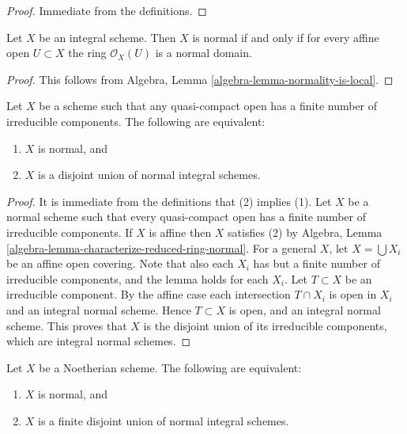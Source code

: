 \begin{proof}
Immediate from the definitions.
\end{proof}

\begin{lemma}
\label{lemma-integral-normal}
Let $X$ be an integral scheme.
Then $X$ is normal if and only if for every affine open
$U \subset X$ the ring $\mathcal{O}_X(U)$ is a normal domain.
\end{lemma}

\begin{proof}
This follows from
Algebra, Lemma \ref{algebra-lemma-normality-is-local}.
\end{proof}

\begin{lemma}
\label{lemma-normal-locally-finite-nr-irreducibles}
Let $X$ be a scheme such that any quasi-compact open has a finite number
of irreducible components. The following are equivalent:
\begin{enumerate}
\item $X$ is normal, and
\item $X$ is a disjoint union of normal integral schemes.
\end{enumerate}
\end{lemma}

\begin{proof}
It is immediate from the definitions that (2) implies (1).
Let $X$ be a normal scheme such that every quasi-compact open
has a finite number of irreducible components.
If $X$ is affine then $X$ satisfies (2) by
Algebra, Lemma \ref{algebra-lemma-characterize-reduced-ring-normal}.
For a general $X$, let $X = \bigcup X_i$ be
an affine open covering. Note that also each $X_i$ has
but a finite number of irreducible components, and the lemma holds
for each $X_i$. Let $T \subset X$ be an irreducible component.
By the affine case each intersection $T \cap X_i$ is open in $X_i$
and an integral normal scheme.
Hence $T \subset X$ is open, and an integral normal scheme.
This proves that $X$ is the disjoint union of its irreducible components,
which are integral normal schemes.
\end{proof}

\begin{lemma}
\label{lemma-normal-Noetherian}
Let $X$ be a Noetherian scheme.
The following are equivalent:
\begin{enumerate}
\item $X$ is normal, and
\item $X$ is a finite disjoint union of normal integral schemes.
\end{enumerate}
\end{lemma}

